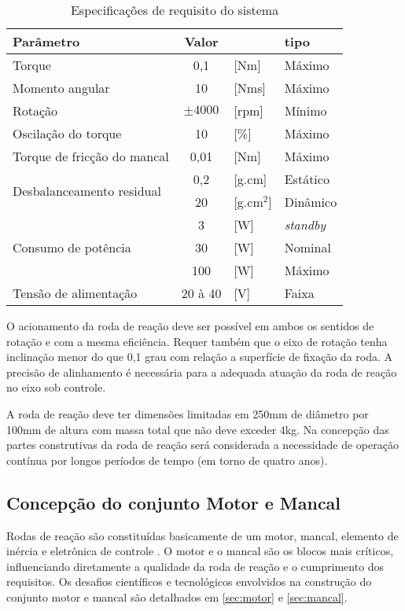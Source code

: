 \begin{table}[!ht]
    \centering
    \begin{tabular}{l c l l}
		Parâmetro & Valor &  & tipo \\
       	\hline
 		Torque   						  & 0,1 & [Nm] & Máximo \\
 		Momento angular  				  & 10 &      [Nms] & Máximo \\
 		Rotação 							  & $\pm4000$ & [rpm] & Mínimo \\
 		Oscilação do torque 				  & 10  & [\%] & Máximo \\
 		Torque de fricção do mancal 		  & 0,01 & [Nm] & Máximo\\
 		\multirow{2}{*}{Desbalanceamento residual} 
 		 & 0,2 & [g.cm] & Estático \\
 		 & 20  & [g.cm$^{2}$] & Dinâmico \\
 		\multirow{3}{*}{Consumo de potência} 
 		& 3 & [W] 	& \textit{standby} \\
 		& 30 & [W] & Nominal \\
 		& 100 & [W] 	& Máximo \\	
 		Tensão de alimentação  & 20 à 40 & [V] & Faixa \\
    \end{tabular}
    \caption{Especificações de requisito do sistema}
    \label{tab:especificações}
\end{table}

O acionamento da roda de reação deve ser possível em ambos os sentidos de rotação e com a mesma eficiência. Requer também que o eixo de rotação tenha inclinação menor do que 0,1 grau com relação a superfície de fixação da roda. A precisão de alinhamento é necessária para a adequada atuação da roda de reação no eixo sob controle.

A roda de reação deve ter dimensões limitadas em 250mm de diâmetro por 100mm de altura com massa total que não deve exceder 4kg. Na concepção das partes construtivas da roda de reação será considerada a necessidade de operação contínua por longos períodos de tempo (em torno de quatro anos).

\subsection{Concepção do conjunto Motor e Mancal}\label{sec:especificacao}

Rodas de reação são constituídas basicamente de um motor, mancal, elemento de inércia e eletrônica de controle . O motor e o mancal são os blocos mais críticos, influenciando diretamente a qualidade da roda de reação e o cumprimento dos requisitos. Os desafios científicos e tecnológicos envolvidos na construção do conjunto motor e mancal são detalhados em \ref{sec:motor} e \ref{sec:mancal}.
	

